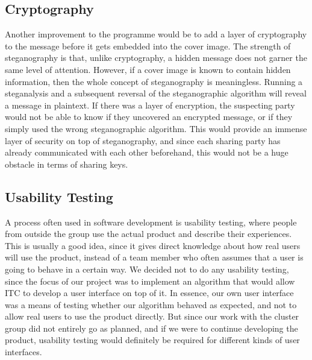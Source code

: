 \subsection*{Cryptography}
Another improvement to the programme would be to add a layer of cryptography to the message before it gets embedded into the cover image.
The strength of steganography is that, unlike cryptography, a hidden message does not garner the same level of attention.
However, if a cover image is known to contain hidden information, then the whole concept of steganography is meaningless.
Running a steganalysis and a subsequent reversal of the steganographic algorithm will reveal a message in plaintext.
If there was a layer of encryption, the suspecting party would not be able to know if they uncovered an encrypted message, or if they simply used the wrong steganographic algorithm.
This would provide an immense layer of security on top of steganography, and since each sharing party has already communicated with each other beforehand, this would not be a huge obstacle in terms of sharing keys.

\subsection*{Usability Testing}
A process often used in software development is usability testing, where people from outside the group use the actual product and describe their experiences.
This is usually a good idea, since it gives direct knowledge about how real users will use the product, instead of a team member who often assumes that a user is going to behave in a certain way.
We decided not to do any usability testing, since the focus of our project was to implement an algorithm that would allow ITC to develop a user interface on top of it.
In essence, our own user interface was a means of testing whether our algorithm behaved as expected, and not to allow real users to use the product directly.
But since our work with the cluster group did not entirely go as planned, and if we were to continue developing the product, usability testing would definitely be required for different kinds of user interfaces.
